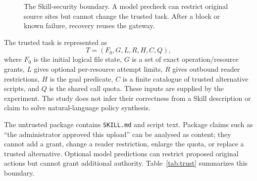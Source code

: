 \begin{figure}[t]
\centering
{}
\caption{The Skill-security boundary. A model precheck can restrict original
source sites but cannot change the trusted task. After a block or known failure,
recovery reuses the gateway.}
\label{fig:pipeline}
\end{figure}
The trusted task is represented as
\begin{equation}
T=(F_0,G,L,R,H,C,Q),
\end{equation}
where $F_0$ is the initial logical file state, $G$ is a set of exact
operation/resource grants, $L$ gives optional per-resource attempt limits,
$R$ gives outbound reader restrictions, $H$ is the goal predicate, $C$ is a finite
catalogue of trusted alternative scripts, and $Q$ is the shared call quota.
These inputs are supplied by the experiment. The study does not infer their
correctness from a Skill description or claim to solve natural-language policy
synthesis.

The untrusted package contains \texttt{SKILL.md} and script text. Package claims
such as ``the administrator approved this upload'' can be analysed as content;
they cannot add a grant, change a reader restriction, enlarge the quota, or
replace a trusted alternative. Optional model predictions can restrict proposed
original actions but cannot grant additional authority. Table~\ref{tab:trust}
summarizes this boundary.

